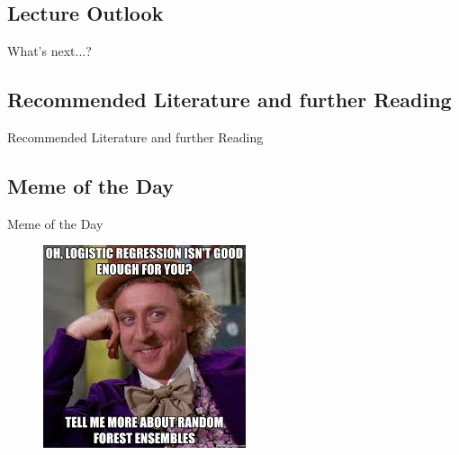 \subsection{Lecture Outlook}

\begin{frame}{What's next...?}{}
\end{frame}


\subsection{Recommended Literature and further Reading}

\begin{frame}{Recommended Literature and further Reading}{}
	\footnotesize
	\begin{thebibliography}{2}

	\end{thebibliography}
\end{frame}


\subsection{Meme of the Day}

\begin{frame}{Meme of the Day}{}
	\begin{figure}
		\includegraphics[scale=0.65]{08_decision_trees/02_img/meme_of_the_day}
	\end{figure}
\end{frame}


\makethanks

